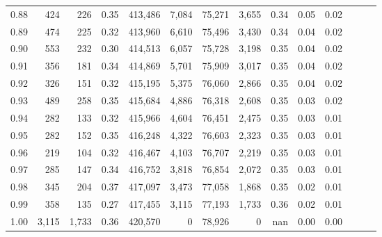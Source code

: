 \begin{tabular}{rrrrrrrrrrrrrr}
0.88 &     424 &    226 &  0.35 &  413,486 &    7,084 &  75,271 &   3,655 &  0.34 &  0.05 &      0.02 \\
0.89 &     474 &    225 &  0.32 &  413,960 &    6,610 &  75,496 &   3,430 &  0.34 &  0.04 &      0.02 \\
0.90 &     553 &    232 &  0.30 &  414,513 &    6,057 &  75,728 &   3,198 &  0.35 &  0.04 &      0.02 \\
0.91 &     356 &    181 &  0.34 &  414,869 &    5,701 &  75,909 &   3,017 &  0.35 &  0.04 &      0.02 \\
0.92 &     326 &    151 &  0.32 &  415,195 &    5,375 &  76,060 &   2,866 &  0.35 &  0.04 &      0.02 \\
0.93 &     489 &    258 &  0.35 &  415,684 &    4,886 &  76,318 &   2,608 &  0.35 &  0.03 &      0.02 \\
0.94 &     282 &    133 &  0.32 &  415,966 &    4,604 &  76,451 &   2,475 &  0.35 &  0.03 &      0.01 \\
0.95 &     282 &    152 &  0.35 &  416,248 &    4,322 &  76,603 &   2,323 &  0.35 &  0.03 &      0.01 \\
0.96 &     219 &    104 &  0.32 &  416,467 &    4,103 &  76,707 &   2,219 &  0.35 &  0.03 &      0.01 \\
0.97 &     285 &    147 &  0.34 &  416,752 &    3,818 &  76,854 &   2,072 &  0.35 &  0.03 &      0.01 \\
0.98 &     345 &    204 &  0.37 &  417,097 &    3,473 &  77,058 &   1,868 &  0.35 &  0.02 &      0.01 \\
0.99 &     358 &    135 &  0.27 &  417,455 &    3,115 &  77,193 &   1,733 &  0.36 &  0.02 &      0.01 \\
1.00 &   3,115 &  1,733 &  0.36 &  420,570 &        0 &  78,926 &       0 &   nan &  0.00 &      0.00 \\
\bottomrule
\end{tabular}
